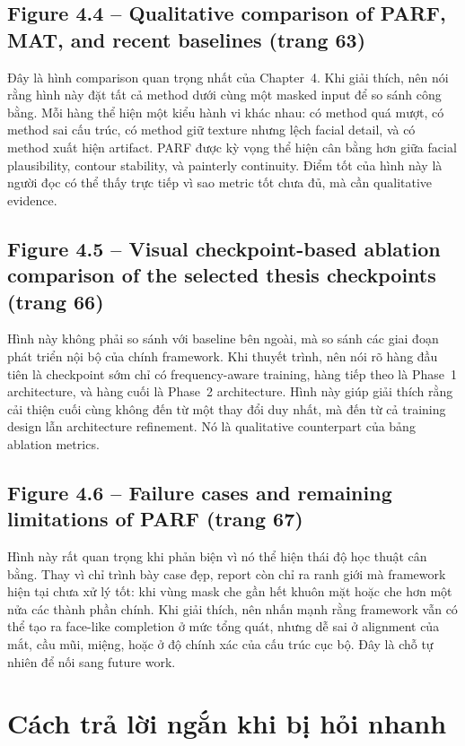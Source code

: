 \documentclass[12pt,a4paper]{article}
\begin{document}
\subsection*{Figure 4.4 -- Qualitative comparison of PARF, MAT, and recent baselines (trang 63)}
Đây là hình comparison quan trọng nhất của Chapter~4. Khi giải thích, nên nói rằng hình này đặt tất cả method dưới cùng một masked input để so sánh công bằng. Mỗi hàng thể hiện một kiểu hành vi khác nhau: có method quá mượt, có method sai cấu trúc, có method giữ texture nhưng lệch facial detail, và có method xuất hiện artifact. PARF được kỳ vọng thể hiện cân bằng hơn giữa facial plausibility, contour stability, và painterly continuity. Điểm tốt của hình này là người đọc có thể thấy trực tiếp vì sao metric tốt chưa đủ, mà cần qualitative evidence.

\subsection*{Figure 4.5 -- Visual checkpoint-based ablation comparison of the selected thesis checkpoints (trang 66)}
Hình này không phải so sánh với baseline bên ngoài, mà so sánh các giai đoạn phát triển nội bộ của chính framework. Khi thuyết trình, nên nói rõ hàng đầu tiên là checkpoint sớm chỉ có frequency-aware training, hàng tiếp theo là Phase~1 architecture, và hàng cuối là Phase~2 architecture. Hình này giúp giải thích rằng cải thiện cuối cùng không đến từ một thay đổi duy nhất, mà đến từ cả training design lẫn architecture refinement. Nó là qualitative counterpart của bảng ablation metrics.

\subsection*{Figure 4.6 -- Failure cases and remaining limitations of PARF (trang 67)}
Hình này rất quan trọng khi phản biện vì nó thể hiện thái độ học thuật cân bằng. Thay vì chỉ trình bày case đẹp, report còn chỉ ra ranh giới mà framework hiện tại chưa xử lý tốt: khi vùng mask che gần hết khuôn mặt hoặc che hơn một nửa các thành phần chính. Khi giải thích, nên nhấn mạnh rằng framework vẫn có thể tạo ra face-like completion ở mức tổng quát, nhưng dễ sai ở alignment của mắt, cầu mũi, miệng, hoặc ở độ chính xác của cấu trúc cục bộ. Đây là chỗ tự nhiên để nối sang future work.

\section{Cách trả lời ngắn khi bị hỏi nhanh}
\end{document}
